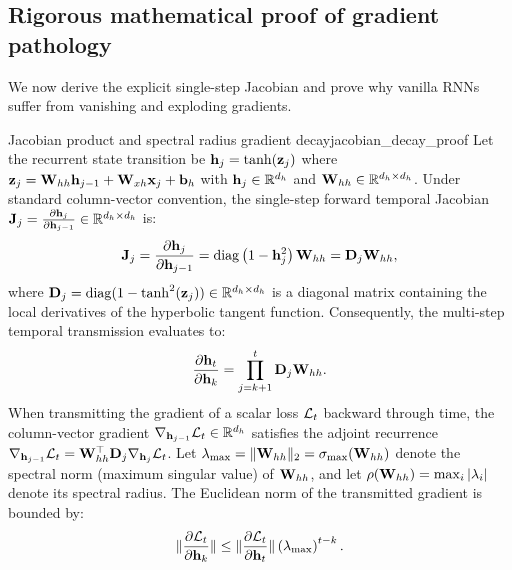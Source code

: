 \documentclass[../../main.tex]{subfiles}
\begin{document}
\subsection{Rigorous mathematical proof of gradient pathology}
We now derive the explicit single-step Jacobian and prove why vanilla RNNs suffer from vanishing and exploding gradients.

\begin{theorem}{Jacobian product and spectral radius gradient decay}{jacobian_decay_proof}
Let the recurrent state transition be $\mathbf{h}_j = \tanh(\mathbf{z}_j)$ where $\mathbf{z}_j = \mathbf{W}_{hh} \mathbf{h}_{j-1} + \mathbf{W}_{xh} \mathbf{x}_j + \mathbf{b}_h$ with $\mathbf{h}_j \in \mathbb{R}^{d_h}$ and $\mathbf{W}_{hh} \in \mathbb{R}^{d_h \times d_h}$.
Under standard column-vector convention, the single-step forward temporal Jacobian $\mathbf{J}_j = \frac{\partial \mathbf{h}_j}{\partial \mathbf{h}_{j-1}} \in \mathbb{R}^{d_h \times d_h}$ is:
\begin{equation}
\label{eq:single_step_jacobian}
\mathbf{J}_j = \frac{\partial \mathbf{h}_j}{\partial \mathbf{h}_{j-1}} = \operatorname{diag}\left( 1 - \mathbf{h}_j^2 \right) \mathbf{W}_{hh} = \mathbf{D}_j \mathbf{W}_{hh},
\end{equation}
where $\mathbf{D}_j = \operatorname{diag}(1 - \tanh^2(\mathbf{z}_j)) \in \mathbb{R}^{d_h \times d_h}$ is a diagonal matrix containing the local derivatives of the hyperbolic tangent function. Consequently, the multi-step temporal transmission evaluates to:
\begin{equation}
\label{eq:full_chain_product}
\frac{\partial \mathbf{h}_t}{\partial \mathbf{h}_k} = \prod_{j=k+1}^t \mathbf{D}_j \mathbf{W}_{hh}.
\end{equation}
When transmitting the gradient of a scalar loss $\mathcal{L}_t$ backward through time, the column-vector gradient $\nabla_{\mathbf{h}_{j-1}} \mathcal{L}_t \in \mathbb{R}^{d_h}$ satisfies the adjoint recurrence $\nabla_{\mathbf{h}_{j-1}} \mathcal{L}_t = \mathbf{W}_{hh}^\top \mathbf{D}_j \nabla_{\mathbf{h}_j} \mathcal{L}_t$.
Let $\lambda_{\max} = \|\mathbf{W}_{hh}\|_2 = \sigma_{\max}(\mathbf{W}_{hh})$ denote the spectral norm (maximum singular value) of $\mathbf{W}_{hh}$, and let $\rho(\mathbf{W}_{hh}) = \max_i |\lambda_i|$ denote its spectral radius. The Euclidean norm of the transmitted gradient is bounded by:
\begin{equation}
\label{eq:gradient_bound}
\lVert\frac{\partial \mathcal{L}_t}{\partial \mathbf{h}_k}\rVert \le \lVert\frac{\partial \mathcal{L}_t}{\partial \mathbf{h}_t}\rVert \left( \lambda_{\max} \right)^{t-k}.
\end{equation}
\end{theorem}
\end{document}
